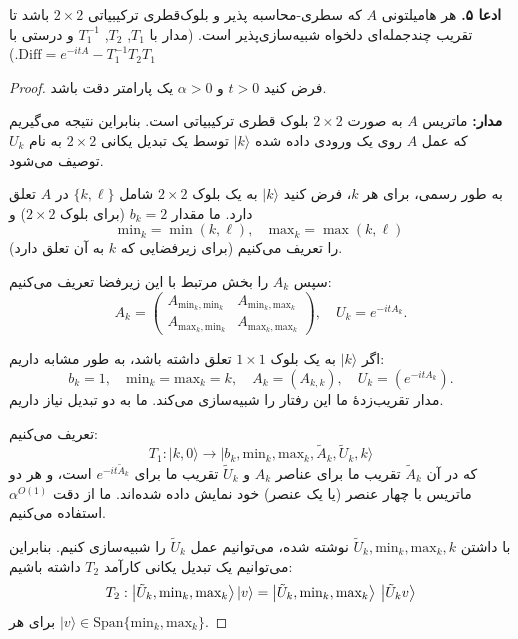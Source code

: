 \textbf{ادعا ۵.}
 هر هامیلتونی $A$ که سطری-‌محاسبه پذیر و بلوک‌قطری ترکیبیاتی $2 \times 2$ باشد تا تقریب چندجمله‌ای دلخواه شبیه‌سازی‌پذیر است. (مدار با $T_1$, $T_2$, $T_1^{-1}$ و درستی با $\mathrm{Diff} = e^{-itA} - T_1^{-1} T_2 T_1$.)
\begin{proof}
	فرض کنید $t > 0$ و $\alpha > 0$ یک پارامتر دقت باشد.  
	
	\textbf{مدار:}  
	ماتریس $A$ به صورت $2 \times 2$ بلوک قطری ترکیبیاتی است. بنابراین نتیجه می‌گیریم که عمل $A$ روی یک ورودی داده شده $|k\rangle$ توسط یک تبدیل یکانی $2 \times 2$ به نام $U_k$ توصیف می‌شود.  
	
	به طور رسمی، برای هر $k$، فرض کنید $|k\rangle$ به یک بلوک $2 \times 2$ شامل $\{k, \ell\}$ در $A$ تعلق دارد. ما مقدار $b_k = 2$ (برای بلوک $2 \times 2$) و  
	\[
	\text{min}_k = \min(k, \ell), \quad \text{max}_k = \max(k, \ell)
	\]  
	(برای زیرفضایی که $k$ به آن تعلق دارد) را تعریف می‌کنیم.  
	
	سپس $A_k$ را بخش مرتبط با این زیرفضا تعریف می‌کنیم:  
	\[
	A_k =
	\begin{pmatrix}
		A_{\text{min}_k, \text{min}_k} & A_{\text{min}_k, \text{max}_k} \\
		A_{\text{max}_k, \text{min}_k} & A_{\text{max}_k, \text{max}_k}
	\end{pmatrix}, 
	\quad U_k = e^{-i t A_k}.
	\]  
	
	اگر $|k\rangle$ به یک بلوک $1 \times 1$ تعلق داشته باشد، به طور مشابه داریم:  
	\[
	b_k = 1, \quad \text{min}_k = \text{max}_k = k, \quad A_k = (A_{k,k}), \quad U_k = (e^{-i t A_k}).
	\]
مدار تقریب‌زدهٔ ما این رفتار را شبیه‌سازی می‌کند. ما به دو تبدیل نیاز داریم.  

تعریف می‌کنیم:  
\[{T_1}:|k,0\rangle  \to |{b_k},{\text{mi}}{{\text{n}}_k},{\text{ma}}{{\text{x}}_k},{\tilde A_k},{\tilde U_k},k\rangle \]  
که در آن
 $\tilde{A}_k$ 
تقریب ما برای عناصر $A_k$ و
 $\tilde{U}_k$
 تقریب ما برای
  $e^{-i t \tilde{A}_k}$ 
 است، و هر دو ماتریس با چهار عنصر (یا یک عنصر) خود نمایش داده شده‌اند.  
ما از دقت 
$\alpha^{O(1)}$ 
استفاده می‌کنیم.  

با داشتن
 $\tilde{U}_k,
 \text{min}_k, \text{max}_k, k$ 
نوشته شده، می‌توانیم عمل
 $\tilde{U}_k$ 
را شبیه‌سازی کنیم. بنابراین می‌توانیم یک تبدیل یکانی کارآمد $T_2$ داشته باشیم:  
\[{T_2}:\left| {{{\tilde U}_k},{\text{mi}}{{\text{n}}_k},{\text{ma}}{{\text{x}}_k}} \right\rangle \left| v \right\rangle  = \left| {{{\tilde U}_k},{\text{mi}}{{\text{n}}_k},{\text{ma}}{{\text{x}}_k}} \right\rangle {\mkern 1mu} \left| {{{\tilde U}_k}v} \right\rangle \]  
برای هر $|v\rangle \in \text{Span}\{\text{min}_k, \text{max}_k\}$.  


\end{proof}
